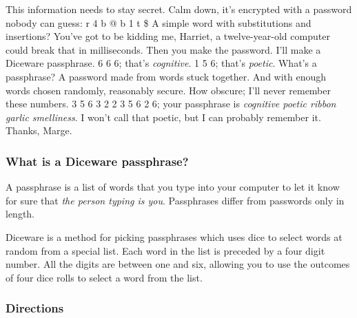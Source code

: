 \label{ch:diceware}


\scene

\begin{drama}
\margespeaks This information needs to stay secret.
\harrietspeaks Calm down, it's encrypted with a password nobody can guess: r 4 b @ b 1 t \$
\margespeaks A simple word with substitutions and insertions? You've got to be kidding me, Harriet, a twelve-year-old computer could break that in milliseconds. 
\harrietspeaks Then you make the password.
\margespeaks {} I'll make a Diceware passphrase.
 6 6 6; that's \textit{cognitive}.
 1 5 6; that's \textit{poetic}.
\harrietspeaks What's a passphrase?
\margespeaks A password made from words stuck together. And with enough words chosen randomly, reasonably secure.
\harrietspeaks How obscure; I'll never remember these numbers.
 3 5 6 3 2 2 3 5 6 2 6; your passphrase is \textit{cognitive poetic ribbon garlic smelliness}.
\harrietspeaks I won't call that poetic, but I can probably remember it. Thanks, Marge.
\end{drama}

\setlength{\parindent}{0em}
\setlength{\parskip}{.75em}

\subsubsection*{What is a Diceware passphrase?}

A passphrase is a list of words that you type into your computer to let it know for sure that \textit{the person typing is you}. Passphrases differ from passwords only in length.

Diceware is a method for picking passphrases which uses dice to select words at random from a special list. Each word in the list is preceded by a four digit number. All the digits are between one and six, allowing you to use the outcomes of four dice rolls to select a word from the list.

\subsubsection*{Directions}

